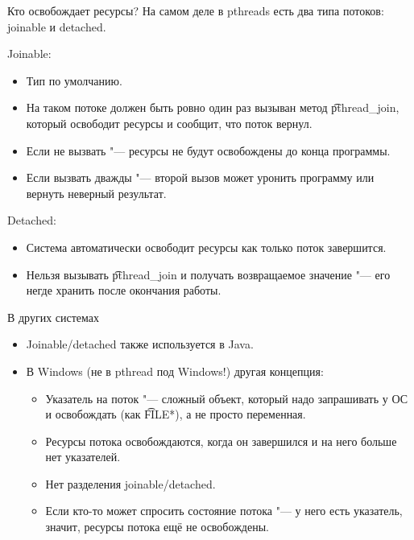 \begin{frame}{Кто освобождает ресурсы?}
	На самом деле в pthreads есть два типа потоков: joinable и detached.

	Joinable:
	\begin{itemize}
		\item Тип по умолчанию.
		\item На таком потоке должен быть ровно один раз вызыван метод \t{pthread\_join}, который освободит ресурсы и сообщит, что поток вернул.
		\item Если не вызвать "--- ресурсы не будут освобождены до конца программы.
		\item Если вызвать дважды "--- второй вызов может уронить программу или вернуть неверный результат.
	\end{itemize}

	Detached:
	\begin{itemize}
		\item Система автоматически освободит ресурсы как только поток завершится.
		\item Нельзя вызывать \t{pthread\_join} и получать возвращаемое значение "--- его негде хранить после окончания работы.
	\end{itemize}
\end{frame}

\begin{frame}{В других системах}
	\begin{itemize}
		\item Joinable/detached также используется в Java.
		\item В Windows (не в pthread под Windows!) другая концепция:
			\begin{itemize}
				\item Указатель на поток "--- сложный объект, который надо запрашивать у ОС и освобождать (как \t{FILE*}), а не просто переменная.
				\item Ресурсы потока освобождаются, когда он завершился и на него больше нет указателей.
				\item Нет разделения joinable/detached.
				\item Если кто-то может спросить состояние потока "--- у него есть указатель, значит, ресурсы потока ещё не освобождены.
			\end{itemize}
	\end{itemize}
\end{frame}


